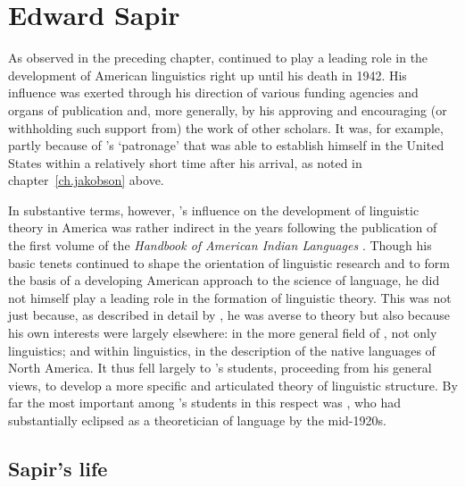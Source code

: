 \chapter{Edward Sapir}
\label{ch.sapir}

As observed in the preceding chapter, {\Boas} continued to play a leading
role in the development of American linguistics right up until his
death in 1942. His influence was exerted through his direction of
various funding agencies and organs of publication and, more
generally, by his approving and encouraging (or withholding such
support from) the work of other scholars. It was, for example, partly
because of {\Boas}'s `patronage' that  was able to
establish himself in the United States within a relatively short time
after his arrival, as noted in chapter~\ref{ch.jakobson} above.

In substantive terms, however, {\Boas}'s influence on the development of
linguistic theory in America was rather indirect in the years
following the publication of the first volume of the \textsl{Handbook
  of American Indian Languages} \citep{boas:handbook_1}. Though his
basic tenets continued to shape the orientation of linguistic research
and to form the basis of a developing American approach to the science
of language, he did not himself play a leading role in the formation
of linguistic theory. This was not just because, as described in
detail by \citet[ch. 3]{murray93:theory.groups}, he was averse to
theory but also because his own interests were largely elsewhere: in
the more general field of , not only linguistics; and
within linguistics, in the description of the native languages of
North America. It thus fell largely to {\Boas}'s students, proceeding
from his general views, to develop a more specific and articulated
theory of linguistic structure. By far the most important among {\Boas}'s
students in this respect was , who had substantially
eclipsed {\Boas} as a theoretician of language by the mid-1920s.

\section{Sapir's life}

